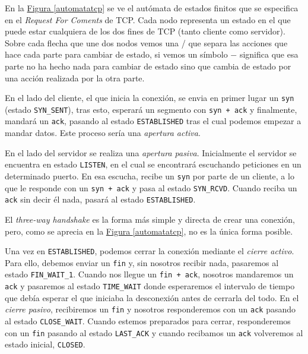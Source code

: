 \documentclass[10pt,a4paper,spanish]{report}
\begin{document}
En la \hyperref[automatatcp]{Figura \ref*{automatatcp}} se ve el autómata de estados finitos que se especifica en el \textit{\textcolor{tema3}{Request For Coments}} de TCP. Cada nodo representa un estado en el que puede estar cualquiera de los dos fines de TCP (tanto cliente como servidor). Sobre cada flecha que une dos nodos vemos una / que separa las acciones que hace cada parte para cambiar de estado, si vemos un símbolo $-$ significa que esa parte no ha hecho nada para cambiar de estado sino que cambia de estado por una acción realizada por la otra parte.

En el lado del cliente, el que inicia la conexión, se envia en primer lugar un \texttt{syn} (estado \texttt{SYN\_SENT}), tras esto, esperará un segmento con \texttt{syn + ack} y finalmente, mandará un \texttt{ack}, pasando al estado \texttt{ESTABLISHED} tras el cual podemos empezar a mandar datos. Este proceso sería una \textit{\textcolor{tema3}{apertura activa}}.

En el lado del servidor se realiza una \textit{\textcolor{tema3}{apertura pasiva}}. Inicialmente el servidor se encuentra en estado \texttt{LISTEN}, en el cual se encontrará escuchando peticiones en un determinado puerto. En esa escucha, recibe un \texttt{syn} por parte de un cliente, a lo que le responde con un \texttt{syn + ack} y pasa al estado \texttt{SYN\_RCVD}. Cuando reciba un \texttt{ack} sin decir él nada, pasará al estado \texttt{ESTABLISHED}.

El \textit{\textcolor{tema3}{three-way handshake}} es la forma más simple y directa de crear una conexión, pero, como se aprecia en la \hyperref[automatatcp]{Figura \ref*{automatatcp}}, no es la única forma posible.

Una vez en \texttt{ESTABLISHED}, podemos cerrar la conexión mediante el \textit{\textcolor{tema3}{cierre activo}}. Para ello, debemos enviar un \texttt{fin} y, sin nosotros recibir nada, pasaremos al estado \texttt{FIN\_WAIT\_1}. Cuando nos llegue un \texttt{fin + ack}, nosotros mandaremos un \texttt{ack} y pasaremos al estado \texttt{TIME\_WAIT} donde esperaremos el intervalo de tiempo que debía esperar el que iniciaba la desconexión antes de cerrarla del todo. En el \textit{\textcolor{tema3}{cierre pasivo}}, recibiremos un \texttt{fin} y nosotros responderemos con un \texttt{ack} pasando al estado \texttt{CLOSE\_WAIT}. Cuando estemos preparados para cerrar, responderemos con un \texttt{fin} pasando al estado \texttt{LAST\_ACK} y cuando recibamos un \texttt{ack} volveremos al estado inicial, \texttt{CLOSED}.
\end{document}
